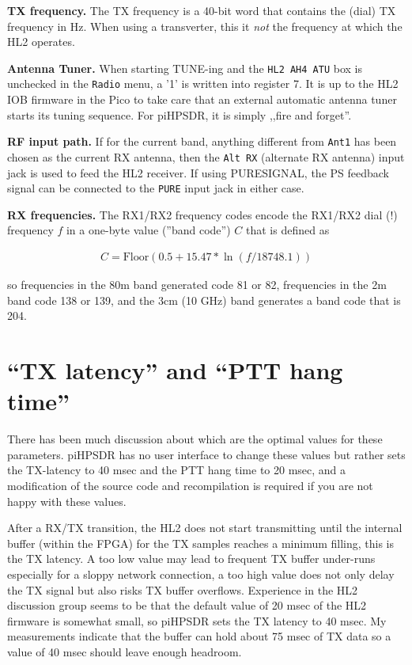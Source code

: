 \documentclass[12pt]{book}
\def\rett#1{\texttt{\color{red}#1}}
\def\bltt#1{\texttt{\color{blue}#1}}
\def\pH{pi\-HPSDR\xspace}
\begin{document}
\textbf{TX frequency.} The TX frequency is a 40-bit word that contains the (dial) TX frequency in Hz. When using
a transverter, this it \textit{not} the frequency at which the HL2 operates.

\textbf{Antenna Tuner.} When starting TUNE-ing and the \rett{HL2 AH4 ATU} box is
unchecked in the \bltt{Radio} menu, a '1' is written into register 7.
It is up to the HL2 IOB firmware in the Pico to take care that an external automatic
antenna tuner starts its tuning sequence. For \pH, it is simply ,,fire and forget''.

\textbf{RF input path.} If for the current band, anything different from
\texttt{Ant1} has been chosen as the current RX antenna, then
 the \texttt{Alt RX} (alternate RX antenna) input jack is used to feed the HL2 receiver.
If using PURESIGNAL, the PS feedback signal can be connected to the \texttt{PURE} input jack
in either case.


\textbf{RX frequencies.} The RX1/RX2 frequency codes encode the  RX1/RX2 dial (!) frequency $f$ in a one-byte
value (''band code'') $C$ that is defined as

\begin{align*}
C = \textrm{Floor}\left( 0.5 + 15.47 * \ln(f / 18748.1)\right)
\end{align*}

so frequencies in the 80m band generated code 81 or 82, frequencies in the 2m band code 138 or 139,
and the 3cm (10 GHz) band generates a band code that is 204.

\section{``TX latency'' and ``PTT hang time''}

There has been much discussion about which are the optimal values for these parameters. \pH has no
user interface to change these values but rather sets the TX-latency to 40 msec and the PTT hang time to 20 msec,
and a modification of the source code and recompilation is required if you are not happy with these values.

After a RX/TX transition, the HL2 does not start transmitting until the internal buffer (within the FPGA)
for the TX samples reaches a  minimum filling, this is the TX latency. A too low value may lead to
frequent TX buffer under-runs especially for a  sloppy network connection, a too high value does not
only delay the TX signal but also risks TX buffer overflows. Experience in the HL2  discussion group
seems to be that the default value of 20 msec of the HL2 firmware
is somewhat small, so \pH sets the TX latency to 40 msec. My measurements
indicate that the buffer can hold about 75 msec of TX data so a value of 40 msec should leave enough headroom.
\end{document}
